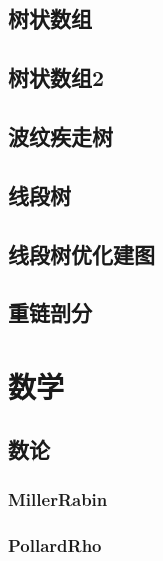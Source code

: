 \documentclass{article}
\begin{document}
\begin{multicols*}{3}
\subsection{树状数组}


\subsection{树状数组2}


\subsection{波纹疾走树}


\subsection{线段树}


\subsection{线段树优化建图}


\subsection{重链剖分}


\section{数学}
\subsection{数论}
\subsubsection{MillerRabin}


\subsubsection{PollardRho}



\end{multicols*}
\end{document}
